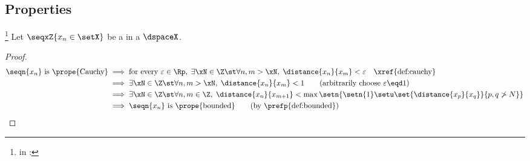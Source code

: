 \subsection{Properties}
\begin{proposition}
\footnote{
  in :
  }
\label{prop:cauchy==>bounded}
Let $\seqxZ{x_n\in\setX}$ be a  in a  $\dspaceX$. %
\end{proposition}
\begin{proof}
\begin{align*}
  \text{$\seqn{x_n}$ is \prope{Cauchy}}
    &\implies \text{for every $\varepsilon\in\Rp$},\; \exists\xN\in\Z \st \forall n,m>\xN,\; \distance{x_n}{x_m}<\varepsilon
    \quad \text{\xref{def:cauchy}}
  \\&\implies \exists\xN\in\Z \st \forall n,m>\xN,\; \distance{x_n}{x_m}<1
    \qquad \text{(arbitrarily choose $\varepsilon\eqd1$)}
  \\&\implies \exists\xN\in\Z \st \forall n,m\in\Z,\; \distance{x_n}{x_{m+1}}<\max\setn{\setn{1}\setu\set{\distance{x_p}{x_q}}{p,q\ngtr N}}
  \\&\implies \text{$\seqn{x_n}$ is \prope{bounded}}
    \qquad \text{(by \prefp{def:bounded})}
\end{align*}
\end{proof}


